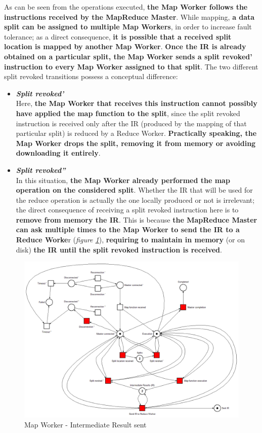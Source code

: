 As can be seen from the operations executed, \textbf{the Map Worker follows the instructions received by the MapReduce Master}. While mapping, \textbf{a data split can be assigned to multiple Map Workers}, in order to increase fault tolerance; as a direct consequence, \textbf{it is possible that a received split location is mapped by another Map Worker}. \textbf{Once the IR is already obtained on a particular split, the Map Worker sends a split revoked' instruction to every Map Worker assigned to that split}. The two different split revoked transitions possess a conceptual difference:
\begin{itemize}
    \item \textit{\textbf{Split revoked'}}\\
    Here, \textbf{the Map Worker that receives this instruction cannot possibly have applied the map function to the split}, since the split revoked instruction is received only after the IR (produced by the mapping of that particular split) is reduced by a Reduce Worker. \textbf{Practically speaking, the Map Worker drops the split, removing it from memory or avoiding downloading it entirely}.
    \item \textit{\textbf{Split revoked''}}\\
    In this situation, \textbf{the Map Worker already performed the map operation on the considered split}. Whether the IR that will be used for the reduce operation is actually the one locally produced or not is irrelevant; the direct consequence of receiving a split revoked instruction here is to \textbf{remove from memory the IR}. This is because \textbf{the MapReduce Master can ask multiple times to the Map Worker to send the IR to a Reduce Worke}r (\textit{figure \ref{fig:map_worker_petri_net_3}}), \textbf{requiring to maintain in memory} (or on disk) \textbf{the IR until the split revoked instruction is received}.
\end{itemize}

\vspace{2mm}

\begin{figure}[!ht]
    \centering
    \includegraphics[width=\linewidth]{document/chapters/chapter_6/images/map_worker_petri_net_3.png}
    \caption{Map Worker - Intermediate Result sent}
    \label{fig:map_worker_petri_net_3}
\end{figure}

